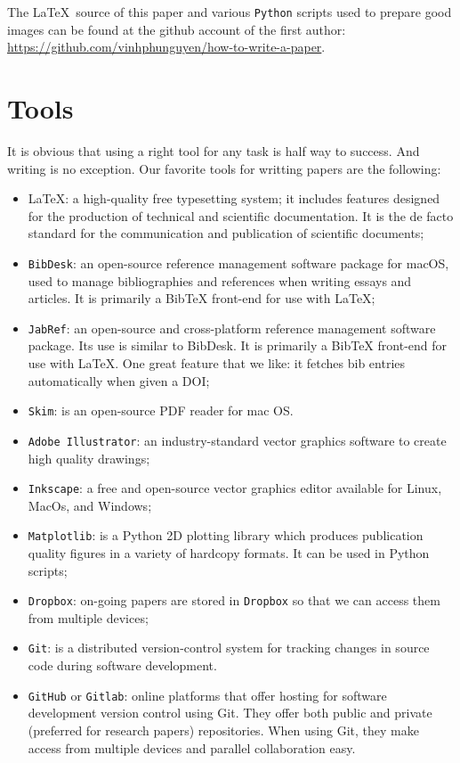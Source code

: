 \documentclass[authoryear,3p,times,preprint,review,fleqn]{elsarticle}
\numberwithin{equation}{section}
\theoremstyle{remark}
\begin{document}
The \LaTeX\ source of this paper and various \texttt{Python} scripts used to prepare good images can be found at the github account of the first author: \url{https://github.com/vinhphunguyen/how-to-write-a-paper}.

\section{Tools}\label{sec:tools}

It is obvious that using a right tool for any task is half way to success. And writing is no exception. Our favorite tools for writting papers are the following:

\begin{itemize}
\item \LaTeX:  a high-quality free typesetting system; it includes features designed for the production of technical and scientific documentation. It is the de facto standard for the communication and publication of scientific documents; 
\item \texttt{BibDesk}: an open-source reference management software package for macOS, used to manage bibliographies and references when writing essays and articles. It is primarily a BibTeX front-end for use with \LaTeX;
\item \texttt{JabRef}:  an open-source and cross-platform reference management software package. Its use is similar to BibDesk. It is primarily a BibTeX front-end for use with \LaTeX. One great feature that we like: it fetches bib entries automatically when given a DOI;
\item \texttt{Skim}: is an open-source PDF reader for mac OS.
\item \texttt{Adobe Illustrator}: an industry-standard vector graphics software to create high quality drawings;
\item \texttt{Inkscape}: a free and open-source vector graphics editor available for Linux, MacOs, and Windows;
\item \texttt{Matplotlib}: is a Python 2D plotting library which produces publication quality figures in a variety of hardcopy formats. It can be used in Python scripts;
\item \texttt{Dropbox}: on-going papers are stored in \texttt{Dropbox} so that we can access them from multiple devices;
\item \texttt{Git}: is a distributed version-control system for tracking changes in source code during software development.
\item \texttt{GitHub} or \texttt{Gitlab}: online platforms that offer hosting for software development version control using Git. They offer both public and private (preferred for research papers) repositories. When using Git, they make access from multiple devices and parallel collaboration easy.
\end{itemize}
\end{document}
